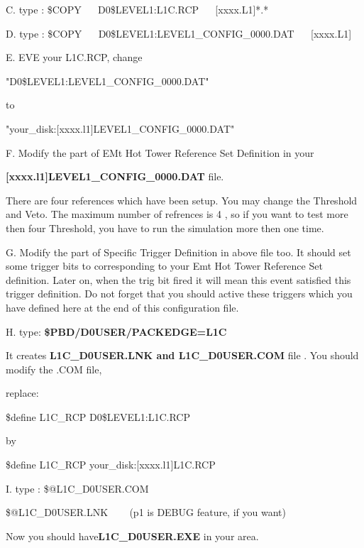 \item{C.}  type : \$COPY ~~ D0\$LEVEL1:L1C.RCP ~~ [xxxx.L1]*.*

\item{D.}  type : \$COPY ~~ D0\$LEVEL1:LEVEL1\_CONFIG\_0000.DAT ~~ [xxxx.L1]

\item{E.}  EVE your L1C.RCP,  change

      "D0\$LEVEL1:LEVEL1\_CONFIG\_0000.DAT"

\item{      to}

      "your\_disk:[xxxx.l1]LEVEL1\_CONFIG\_0000.DAT"

\item{F.}  Modify the part of EMt Hot Tower Reference Set 
Definition in your

    {\bf [xxxx.l1]LEVEL1\_CONFIG\_0000.DAT}  file. 

There are four references which
have been setup. You may change the Threshold and Veto. The maximum
number of refrences is 4 , so if you want to test more then four 
Threshold, you have to run the simulation more then one time.

\item{G.}  Modify the part of Specific Trigger Definition in above file too. It 
    should set some trigger bits to corresponding to your Emt Hot Tower
    Reference Set definition. Later on, when the trig bit fired it will
    mean this event satisfied this trigger definition.  Do not forget 
that you should active these triggers which you have defined here at 
the end of this configuration file.


\item{H.}  type:  {\bf    \$PBD/D0USER/PACKEDGE=L1C}

\item{It}  creates {\bf L1C\_D0USER.LNK and L1C\_D0USER.COM} file .
You should modify the  .COM file, 

replace:

     \$define L1C\_RCP D0\$LEVEL1:L1C.RCP
\item{   by}

     \$define L1C\_RCP your\_disk:[xxxx.l1]L1C.RCP

\item{I.}  type : \$@L1C\_D0USER.COM

           \$@L1C\_D0USER.LNK ~~~ (p1 is DEBUG feature, if you want)

    Now you should have{\bf L1C\_D0USER.EXE} in your area.

